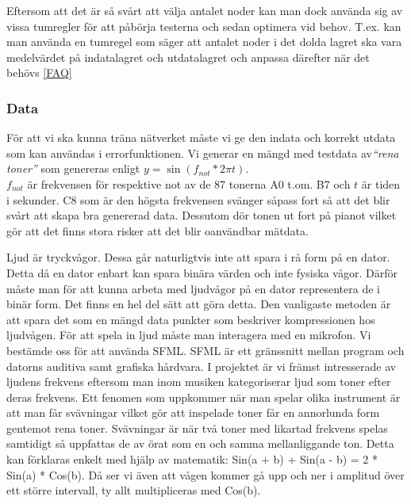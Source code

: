 \documentclass[a4paper,10pt]{article}
\begin{document}
Eftersom att det är så svårt att välja antalet noder kan man dock använda sig av vissa tumregler för att påbörja testerna och sedan optimera vid behov. T.ex. kan man använda en tumregel som säger att antalet noder i det dolda lagret ska vara medelvärdet på indatalagret och utdatalagret \autocite{StackExchange} och anpassa därefter när det behövs \ref{FAQ}

\subsubsection{Data}
För att vi ska kunna träna nätverket måste vi ge den indata och korrekt utdata som kan användas i errorfunktionen. Vi generar en mängd med testdata av\emph{``rena toner''} som genereras enligt $y=\sin(f_{not}*2\pi t)$.\autocite{Wave}\\
$f_{not}$ är frekvensen för respektive not av de 87 tonerna A0 t.om. B7 och $t$ är tiden i sekunder. C8 som är den högsta frekvensen svänger såpass fort så att det blir svårt att skapa bra genererad data. Dessutom dör tonen ut fort på pianot vilket gör att det finns stora risker att det blir oanvändbar mätdata.

Ljud är tryckvågor. Dessa går naturligtvis inte att spara i rå form på en dator. Detta då en dator enbart kan spara binära värden och inte fysiska vågor. Därför måste man för att kunna arbeta med ljudvågor på en dator representera de i binär form. Det finns en hel del sätt att göra detta. Den vanligaste metoden är att spara det som en mängd data punkter som beskriver kompressionen hos ljudvågen. 
För att spela in ljud måste man interagera med en mikrofon. Vi bestämde oss för att använda SFML. SFML är ett gränssnitt mellan program och datorns auditiva samt grafiska hårdvara.  
I projektet är vi främst intresserade av ljudens frekvens eftersom man inom musiken kategoriserar ljud som toner efter deras frekvens. Ett fenomen som uppkommer när man spelar olika instrument är att man får svävningar vilket gör att inspelade toner får en annorlunda form gentemot rena toner. Svävningar är när två toner med likartad frekvens spelas samtidigt så uppfattas de av örat som en och samma mellanliggande ton\autocite{BEAT}. Detta kan förklaras enkelt med hjälp av matematik: Sin(a + b) + Sin(a - b) = 2 * Sin(a) * Cos(b). Då ser vi även att vågen kommer gå upp och ner i amplitud över ett större intervall, ty allt multipliceras med Cos(b). 
\end{document}
